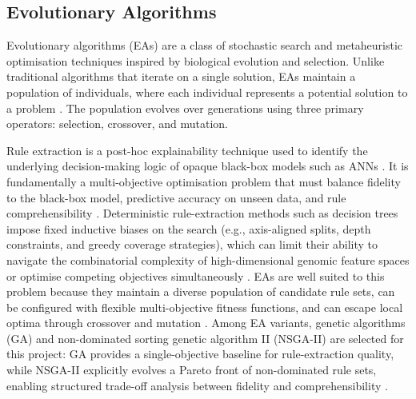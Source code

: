 \subsection{Evolutionary Algorithms}\label{sec:ea}

Evolutionary algorithms (EAs) are a class of stochastic search and metaheuristic optimisation techniques inspired by biological evolution and selection. Unlike traditional algorithms that iterate on a single solution, EAs maintain a population of individuals, where each individual represents a potential solution to a problem \citep{yedjour2024}. The population evolves over generations using three primary operators: selection, crossover, and mutation.

Rule extraction is a post-hoc explainability technique used to identify the underlying decision-making logic of opaque black-box models such as ANNs \citep{yedjour2024}. It is fundamentally a multi-objective optimisation problem that must balance fidelity to the black-box model, predictive accuracy on unseen data, and rule comprehensibility \citep{yedjour2024}. Deterministic rule-extraction methods such as decision trees impose fixed inductive biases on the search (e.g., axis-aligned splits, depth constraints, and greedy coverage strategies), which can limit their ability to navigate the combinatorial complexity of high-dimensional genomic feature spaces or optimise competing objectives simultaneously \citep{arrieta2020,yedjour2024}. EAs are well suited to this problem because they maintain a diverse population of candidate rule sets, can be configured with flexible multi-objective fitness functions, and can escape local optima through crossover and mutation \citep{yedjour2024}. Among EA variants, genetic algorithms (GA) and non-dominated sorting genetic algorithm II (NSGA-II) are selected for this project: GA provides a single-objective baseline for rule-extraction quality, while NSGA-II explicitly evolves a Pareto front of non-dominated rule sets, enabling structured trade-off analysis between fidelity and comprehensibility \citep{deb2002}.